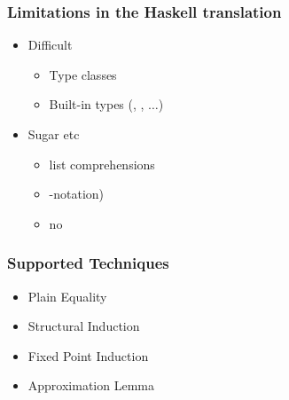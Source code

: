 \documentclass[serif,professionalfont]{beamer}
\begin{document}
\begin{frame}[fragile]
  \frametitle{Limitations in the Haskell translation}
  \begin{itemize}
    \item Difficult
      \begin{itemize}
        \item Type classes \\
        \item Built-in types (, ,  $\ldots$)
      \end{itemize}
    \item Sugar etc
      \begin{itemize}
        \item list comprehensions \\
        \item {}-notation) \\
        \item no 
      \end{itemize}
  \end{itemize}
\end{frame}

%

\begin{frame}[fragile]
\frametitle{Supported Techniques}
\label{sec-4}
\begin{itemize}

\item Plain Equality \\
\item Structural Induction \\
\item Fixed Point Induction \\
\item Approximation Lemma

%
%
%
%

\end{itemize} %
\end{frame}
\end{document}
